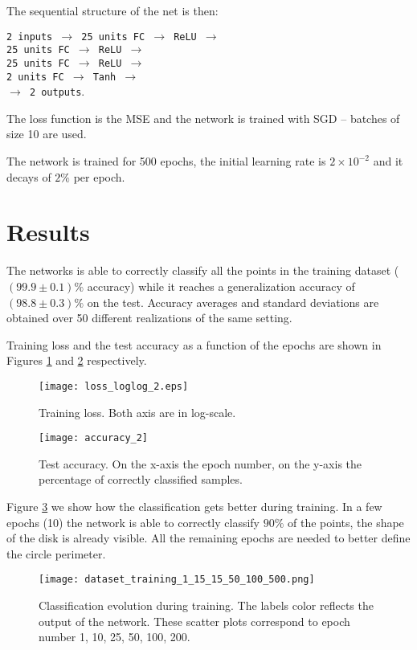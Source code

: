 \documentclass[11pt,conference,compsocconf]{IEEEtran}
\begin{document}
The sequential structure of the net is then:

\begin{flushright}
\texttt{2 inputs $\rightarrow$ 25 units FC $\rightarrow$ ReLU $\rightarrow$ \\   25 units FC $\rightarrow$ ReLU $\rightarrow$ \\ 25 units FC $\rightarrow$ ReLU  $\rightarrow$ \\
2 units FC $\rightarrow$ Tanh $\rightarrow$ \\
$\rightarrow$ 2 outputs}.
\end{flushright}

The loss function is the MSE and the network is trained with SGD -- batches of size 10 are used.

The network is trained for 500 epochs, the initial learning rate is $2\times10^{-2}$ and it decays of $2\%$ per epoch. 



\section{Results}

The networks is able to correctly classify all the points in the training dataset ($(99.9 \pm 0.1) \%$ accuracy) while it reaches a generalization accuracy of $ (98.8 \pm 0.3) \%$ on the test. Accuracy averages and standard deviations are obtained over 50 different realizations of the same setting.


Training loss and the test accuracy as a function of the epochs are shown in Figures \ref{fig:loss} and \ref{fig:accuracy} respectively.

\begin{figure}
    \centering
    \texttt{[image: loss\_loglog\_2.eps]}
    \caption{Training loss. Both axis are in log-scale.}
    \label{fig:loss}
\end{figure}

\begin{figure}
    \centering
    \texttt{[image: accuracy\_2]}
    \caption{Test accuracy. On the x-axis the epoch number, on the y-axis the percentage of correctly classified samples.}
    \label{fig:accuracy}
\end{figure}

Figure \ref{fig:dataset_epochs} we show how the classification gets better during training. In a few epochs (10) the network is able to correctly classify $90\%$ of the points, the shape of the disk is already visible. All the remaining epochs are needed to better define the circle perimeter.



\begin{figure}
    \centering
    \texttt{[image: dataset\_training\_1\_15\_15\_50\_100\_500.png]}
    \caption{Classification evolution during training. The labels color reflects the output of the network. These scatter plots correspond to epoch number 1, 10, 25, 50, 100, 200.}
    \label{fig:dataset_epochs}
\end{figure}




\end{document}
